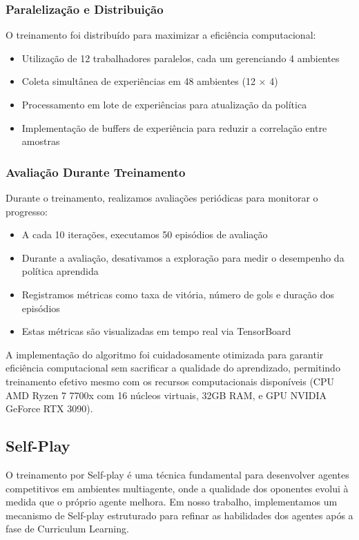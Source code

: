 \subsubsection{Paralelização e Distribuição}

O treinamento foi distribuído para maximizar a eficiência computacional:

\begin{itemize}
    \item Utilização de 12 trabalhadores paralelos, cada um gerenciando 4 ambientes
    \item Coleta simultânea de experiências em 48 ambientes (12 × 4)
    \item Processamento em lote de experiências para atualização da política
    \item Implementação de buffers de experiência para reduzir a correlação entre amostras
\end{itemize}

\subsubsection{Avaliação Durante Treinamento}

Durante o treinamento, realizamos avaliações periódicas para monitorar o progresso:

\begin{itemize}
    \item A cada 10 iterações, executamos 50 episódios de avaliação
    \item Durante a avaliação, desativamos a exploração para medir o desempenho da política aprendida
    \item Registramos métricas como taxa de vitória, número de gols e duração dos episódios
    \item Estas métricas são visualizadas em tempo real via TensorBoard
\end{itemize}

A implementação do algoritmo foi cuidadosamente otimizada para garantir eficiência computacional sem sacrificar a qualidade do aprendizado, permitindo treinamento efetivo mesmo com os recursos computacionais disponíveis (CPU AMD Ryzen 7 7700x com 16 núcleos virtuais, 32GB RAM, e GPU NVIDIA GeForce RTX 3090).

\subsection{Self-Play}

O treinamento por Self-play é uma técnica fundamental para desenvolver agentes competitivos em ambientes multiagente, onde a qualidade dos oponentes evolui à medida que o próprio agente melhora. Em nosso trabalho, implementamos um mecanismo de Self-play estruturado para refinar as habilidades dos agentes após a fase de Curriculum Learning.

